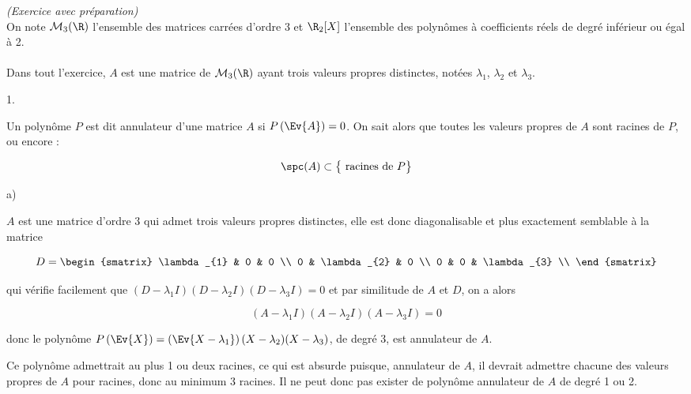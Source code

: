 \documentclass[11pt]{article}%
\begin{document}
 \begin{exercice}{\it (Exercice avec préparation)}~\\
 On note $\mathcal{M}_{3} (\R)$ l'ensemble des matrices carrées d'ordre
3 et $\R_{2} [X]$ l'ensemble des polynômes à coefficients réels de
degré inférieur ou égal à 2. \\
\\
 Dans tout l'exercice, $A$ est une matrice de $\mathcal{M}_{3} (\R)$
ayant trois valeurs propres distinctes, notées $\lambda_{1}$,
$\lambda_{2}$ et $\lambda_{3}$. \\
 \begin{noliste}{1.}
 \setlength{\itemsep}{4mm}
 \item Un polynôme $P$ est dit annulateur d'une matrice $A$ si
$P\left(\Ev{A}\right) = 0$. On sait alors que toutes les valeurs
propres de $A$ sont racines de $P$, ou encore : 
 
\[
 \spc ( A ) \subset \left\{ \text{ racines de } P \rule{0cm}{0.3cm}
\right\} 
\]

 \item \begin{noliste}{a)}
 \setlength{\itemsep}{2mm}

 \item $A$ est une matrice d'ordre 3 qui admet trois valeurs propres
distinctes, elle est donc diagonalisable et plus exactement semblable à
la matrice
 
\[
 D = \begin{smatrix}
\lambda_{1} & 0 & 0 \\
0 & \lambda_{2} & 0 \\
0 & 0 & \lambda_{3} \\
\end{smatrix}
\]

 qui vérifie facilement que $ ( D - \lambda_{1} I ) ( D - \lambda_{2} I
) ( D - \lambda_{3} I ) = 0$ et par similitude de $A$ et $D$, on a
alors
 
\[
 ( A - \lambda_{1} I ) ( A - \lambda_{2} I ) ( A - \lambda_{3} I ) = 0 
\]

 donc le polynôme $P\left(\Ev{X}\right) = \left(\Ev{ X - \lambda_{1}
}\right) ( X - \lambda_{2} ) ( X - \lambda_{3} )$, de degré 3, est
annulateur de $A$. \\

 \item Ce polynôme admettrait au plus 1 ou deux racines, ce qui est
absurde puisque, annulateur de $A$, il devrait admettre chacune des
valeurs propres de $A$ pour racines, donc au minimum 3 racines. Il ne
peut donc pas exister de polynôme annulateur de $A$ de degré 1 ou 2. \\


\end{noliste}
\end{noliste}
\end{exercice}
\end{document}
